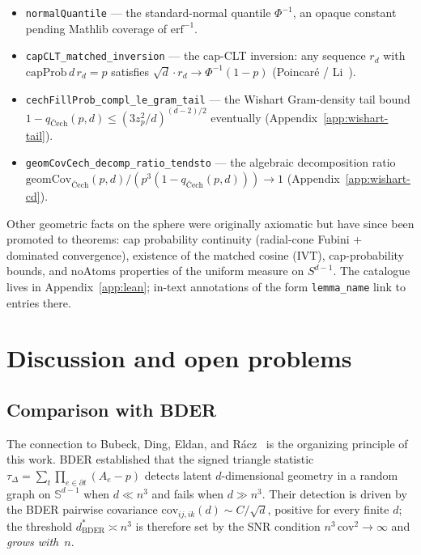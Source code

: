 \documentclass[reqno,12pt]{amsart}
\newcommand{\geomCov}{\mathrm{geomCov}}
\newcommand{\Sph}{\mathbb{S}}
\newcommand{\lean}[1]{\textup{\texttt{\small #1}}}
\theoremstyle{plain}
\theoremstyle{definition}
\theoremstyle{remark}
\begin{document}
\begin{itemize}[leftmargin=*, itemsep=2pt]
  \item \texttt{normalQuantile} --- the standard-normal quantile $\Phi^{-1}$, an opaque
    constant pending Mathlib coverage of $\mathrm{erf}^{-1}$.
  \item \texttt{capCLT\_matched\_inversion} --- the cap-CLT inversion: any sequence
    $r_d$ with $\mathrm{capProb}\,d\,r_d = p$ satisfies $\sqrt d \cdot r_d \to
    \Phi^{-1}(1 - p)$ (Poincar\'e / Li~\cite{Li2011}).
  \item \texttt{cechFillProb\_compl\_le\_gram\_tail} --- the Wishart Gram-density tail
    bound $1 - q_{\text{\v{C}ech}}(p, d) \le (3 z_p^2 / d)^{(d-2)/2}$ eventually
    (Appendix~\ref{app:wishart-tail}).
  \item \texttt{geomCovCech\_decomp\_ratio\_tendsto} --- the algebraic decomposition
    ratio $\geomCov_{\text{\v{C}ech}}(p, d) / (p^3 (1 - q_{\text{\v{C}ech}}(p, d))) \to 1$
    (Appendix~\ref{app:wishart-cd}).
\end{itemize}

Other geometric facts on the sphere were originally axiomatic but have since been
promoted to theorems: cap probability continuity (radial-cone Fubini + dominated
convergence), existence of the matched cosine (IVT), cap-probability bounds, and
$\mathrm{noAtoms}$ properties of the uniform measure on $S^{d-1}$. The catalogue lives in
Appendix~\ref{app:lean}; in-text annotations of the form \lean{lemma\_name} link to
entries there.

\section{Discussion and open problems}\label{sec:discussion}

\subsection{Comparison with BDER}\label{sec:comparison-bder}

The connection to Bubeck, Ding, Eldan, and R\'acz~\cite{Bubeck2016} is the organizing
principle of this work. BDER established that the signed triangle statistic
$\tau_\Delta = \sum_t\prod_{e\in\partial t}(A_e - p)$ detects latent $d$-dimensional
geometry in a random graph on $\Sph^{d-1}$ when $d \ll n^3$ and fails when
$d\gg n^3$. Their detection is driven by the BDER pairwise covariance
$\mathrm{cov}_{ij,ik}(d)\sim C/\sqrt{d}$, positive for every finite $d$; the
threshold $d^*_{\mathrm{BDER}}\asymp n^3$ is therefore set by the SNR condition
$n^3\,\mathrm{cov}^2\to\infty$ and \emph{grows with}~$n$.
\end{document}
